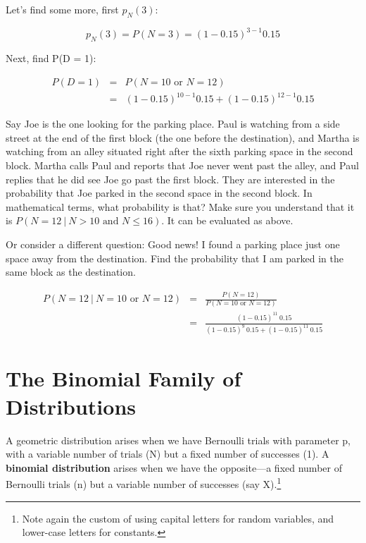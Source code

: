 Let's find some more, first $p_N(3)$:

\begin{equation}
p_N(3) = P(N = 3) = (1-0.15)^{3-1} 0.15
\end{equation}

Next, find P(D = 1):

\begin{eqnarray}
P(D = 1) &=& P(N = 10 \textrm{ or } N = 12) \\
&=& (1-0.15)^{10-1} 0.15 + (1-0.15)^{12-1} 0.15
\end{eqnarray}

Say Joe is the one looking for the parking place.  Paul is watching from
a side street at the end of the first block (the one before the
destination), and Martha is watching from an alley situated right after
the sixth parking space in the second block.  Martha calls Paul and
reports that Joe never went past the alley, and Paul replies that he did
see Joe go past the first block.  They are interested in the probability
that Joe parked in the second space in the second block.  In
mathematical terms, what probability is that?  Make sure you understand
that it is $P(N = 12 ~|~ N > 10 \textrm{ and } N \leq 16)$.  It can be
evaluated as above.

Or consider a different question: Good news!  I found a parking place
just one space away from the destination.  Find the probability that I
am parked in the same block as the destination.

\begin{eqnarray}
P(N = 12 ~|~ N = 10 \textrm{ or } N = 12) &=&
\frac{P(N = 12)}{P(N = 10 \textrm{ or } N = 12)} \\
&=& \frac
{(1-0.15)^{11} ~ 0.15}
{(1-0.15)^{9} ~ 0.15 + (1-0.15)^{11} ~ 0.15}
\end{eqnarray}

\section{The Binomial Family of Distributions}
\label{binom}

A geometric distribution arises when we have Bernoulli trials with
parameter p, with a variable number of trials (N) but a fixed number of
successes (1).  A {\bf binomial distribution} arises when we have the
opposite---a fixed number of Bernoulli trials (n) but a variable number
of successes (say X).\footnote{Note again the custom of using capital
letters for random variables, and lower-case letters for constants.}

